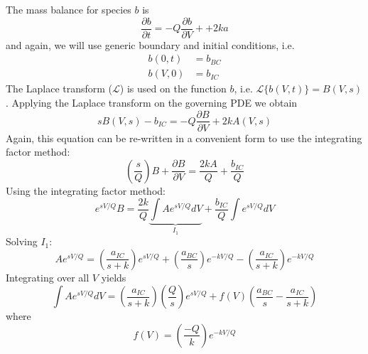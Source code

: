 \documentclass[a4paper,12pt]{article}
\begin{document}
The mass balance for species $b$ is 
\begin{equation}
	\frac{\partial b}{\partial t} = -Q\frac{\partial b}{\partial V} + +2ka
\end{equation}
and again, we will use generic boundary and initial conditions, i.e.
\begin{align}
	b(0, t) &= b_{BC}\\
	b(V, 0) &= b_{IC} 
\end{align}
The Laplace transform ($\mathscr{L}$) is used on the function $b$, i.e. $ \mathscr{L}\{b(V, t)\} = B(V, s) $.
Applying the Laplace transform on the governing PDE we obtain 
\begin{equation}
	sB(V,s) - b_{IC} = -Q\frac{\partial B}{\partial V} + 2kA(V,s)
\end{equation}
Again, this equation can be re-written in a convenient form to use the integrating factor method:
\begin{equation}
	\left( \frac{s}{Q} \right) B + \frac{\partial B}{\partial V} = \frac{2kA}{Q} + \frac{b_{IC}}{Q}
\end{equation}
Using the integrating factor method:
\begin{equation}
	e^{sV/Q}B = \frac{2k}{Q} \underbrace{ \int Ae^{sV/Q} dV}_{I_1}
					+ \frac{b_{IC}}{Q} \int e^{sV/Q} dV
\end{equation}
Solving $I_1$:
\begin{equation}
	Ae^{sV/Q} = \left( \frac{a_{IC}}{s+k}\right) e^{sV/Q} +
				\left( \frac{a_{BC}}{s}\right) e^{-kV/Q}  - 
				\left( \frac{a_{IC}}{s+k}\right) e^{-kV/Q} 
\end{equation}
Integrating over all $V$ yields 
\begin{equation}
	\int Ae^{sV/Q} dV = \left( \frac{a_{IC}}{s+k}\right) \left( \frac{Q}{s}\right) e^{sV/Q} +
						f(V) \left( \frac{a_{BC}}{s} - \frac{a_{IC}}{s+k} \right)
\end{equation}
where
\begin{equation}
	f(V) = \left( \frac{-Q}{k} \right) e^{-kV/Q}
\end{equation}
\end{document}
